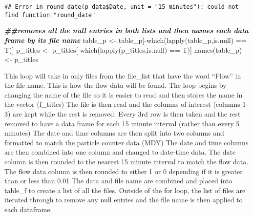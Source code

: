 \documentclass[
]{article}
\newenvironment{Shaded}{\begin{snugshade}}{\end{snugshade}}
\newcommand{\DocumentationTok}[1]{\textcolor[rgb]{0.56,0.35,0.01}{\textbf{\textit{#1}}}}
\newcommand{\FunctionTok}[1]{\textcolor[rgb]{0.00,0.00,0.00}{#1}}
\newcommand{\NormalTok}[1]{#1}
\newcommand{\OtherTok}[1]{\textcolor[rgb]{0.56,0.35,0.01}{#1}}
\newcommand{\SpecialCharTok}[1]{\textcolor[rgb]{0.00,0.00,0.00}{#1}}
\begin{document}
\begin{verbatim}
## Error in round_date(p_data$Date, unit = "15 minutes"): could not find function "round_date"
\end{verbatim}

\begin{Shaded}
\begin{Highlighting}[]
\DocumentationTok{\#\#removes all the null entries in both lists and then names each data frame by its file name}
\NormalTok{table\_p }\OtherTok{\textless{}{-}}\NormalTok{ table\_p[}\SpecialCharTok{{-}}\FunctionTok{which}\NormalTok{(}\FunctionTok{lapply}\NormalTok{(table\_p,is.null) }\SpecialCharTok{==}\NormalTok{ T)]}
\NormalTok{p\_titles }\OtherTok{\textless{}{-}}\NormalTok{ p\_titles[}\SpecialCharTok{{-}}\FunctionTok{which}\NormalTok{(}\FunctionTok{lapply}\NormalTok{(p\_titles,is.null) }\SpecialCharTok{==}\NormalTok{ T)]}
\FunctionTok{names}\NormalTok{(table\_p) }\OtherTok{\textless{}{-}}\NormalTok{ p\_titles}
\end{Highlighting}
\end{Shaded}

This loop will take in only files from the file\_list that have the word
``Flow'' in the file name. This is how the flow data will be found. The
loop begins by changing the name of the file so it is easier to read and
then stores the name in the vector (f\_titles) The file is then read and
the columns of interest (columns 1-3) are kept while the rest is
removed. Every 3rd row is then taken and the rest removed to have a data
frame for each 15 minute interval (rather than every 5 minutes) The date
and time columns are then split into two columns and formatted to match
the particle counter data (MDY) The date and time columns are then
combined into one column and changed to date-time data. The date column
is then rounded to the nearest 15 minute interval to match the flow
data. The flow data column is then rounded to either 1 or 0 depending if
it is greater than or less than 0.01 The data and file name are combined
and placed into table\_f to create a list of all the files. Outside of
the for loop, the list of files are iterated through to remove any null
entries and the file name is then applied to each dataframe.
\end{document}
